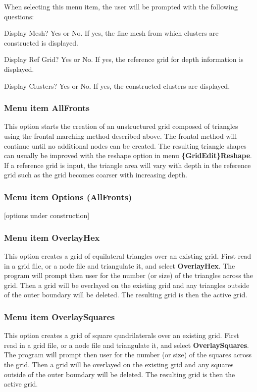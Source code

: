 \documentclass{article}
\begin{document}
When selecting this menu item, the user will be prompted with the following questions:\\

\begin{description}
 \item Display Mesh? Yes or No. If yes, the fine mesh from which clusters are constructed is displayed.
 \item Display Ref Grid? Yes or No. If yes, the reference grid for depth information is displayed.
 \item Display Clusters? Yes or No. If yes, the constructed clusters are displayed.
\end{description}

\subsubsection[Menu item AllFronts]{Menu item AllFronts}
This option starts the creation of an unstructured grid composed of triangles using the frontal marching method described above. The frontal method will continue until no additional nodes can be created. The resulting triangle shapes can usually be improved with the reshape option in menu {\bf \{GridEdit\}Reshape}.
If a reference grid is input, the triangle area will vary with depth in the reference grid such as the grid becomes coarser with increasing depth.  

\subsubsection[Menu item Options (AllFronts)]{Menu item Options (AllFronts)}
[options under construction]

\subsubsection[Menu item OverlayHex]{Menu item OverlayHex}
This option creates a grid of equilateral triangles over an existing grid. First read in a grid file, or a node file and triangulate it, and select {\bf OverlayHex}. The program will prompt then user for the number (or size) of the triangles across the grid. Then a grid will be overlayed on the existing grid and any triangles outside of the outer boundary will be deleted. The resulting grid is then the active grid.


\subsubsection[Menu item OverlaySquares]{Menu item OverlaySquares}
This option creates a grid of square quadrilaterals over an existing grid. First read in a grid file, or a node file and triangulate it, and select {\bf OverlaySquares}. The program will prompt then user for the number (or size) of the squares across the grid. Then a grid will be overlayed on the existing grid and any squares outside of the outer boundary will be deleted. The resulting grid is then the active grid.
\end{document}
